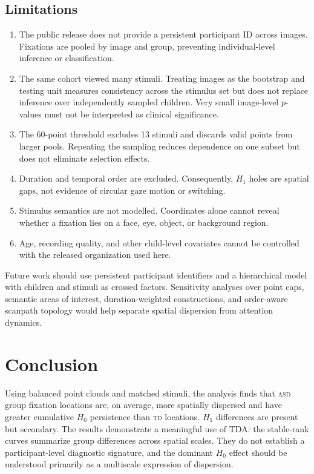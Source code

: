 \documentclass[11pt,a4paper]{article}
\newcommand{\ASD}{\textsc{asd}}
\newcommand{\TD}{\textsc{td}}
\begin{document}
\subsection{Limitations}

\begin{enumerate}
  \item The public release does not provide a persistent participant ID across
  images.  Fixations are pooled by image and group, preventing individual-level
  inference or classification.
  \item The same cohort viewed many stimuli.  Treating images as the bootstrap
  and testing unit measures consistency across the stimulus set but does not
  replace inference over independently sampled children.  Very small
  image-level $p$-values must not be interpreted as clinical significance.
  \item The 60-point threshold excludes 13 stimuli and discards valid points
  from larger pools.  Repeating the sampling reduces dependence on one subset
  but does not eliminate selection effects.
  \item Duration and temporal order are excluded.  Consequently, $H_1$ holes
  are spatial gaps, not evidence of circular gaze motion or switching.
  \item Stimulus semantics are not modelled.  Coordinates alone cannot reveal
  whether a fixation lies on a face, eye, object, or background region.
  \item Age, recording quality, and other child-level covariates cannot be
  controlled with the released organization used here.
\end{enumerate}

Future work should use persistent participant identifiers and a hierarchical
model with children and stimuli as crossed factors.  Sensitivity analyses over
point caps, semantic areas of interest, duration-weighted constructions, and
order-aware scanpath topology would help separate spatial dispersion from
attention dynamics.

\section{Conclusion}

Using balanced point clouds and matched stimuli, the analysis finds that \ASD{}
group fixation locations are, on average, more spatially dispersed and have
greater cumulative $H_0$ persistence than \TD{} locations.  $H_1$ differences
are present but secondary.  The results demonstrate a meaningful use of TDA:
the stable-rank curves summarize group differences across spatial scales.
They do not establish a participant-level diagnostic signature, and the
dominant $H_0$ effect should be understood primarily as a multiscale expression
of dispersion.
\end{document}
